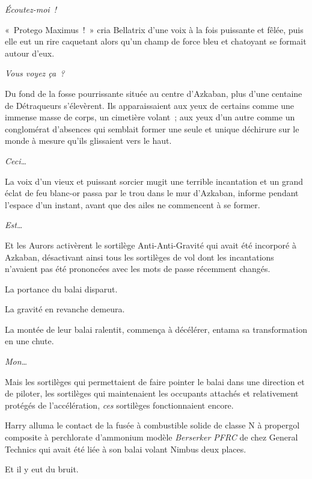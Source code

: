 \emph{Écoutez-moi~!}

«~Protego Maximus~!~» cria Bellatrix d'une voix à la fois puissante et fêlée, puis elle eut un rire caquetant alors qu'un champ de force bleu et chatoyant se formait autour d'eux.

\emph{Vous voyez ça~?}

Du fond de la fosse pourrissante située au centre d'Azkaban, plus d'une centaine de Détraqueurs s'élevèrent. Ils apparaissaient aux yeux de certains comme une immense masse de corps, un cimetière volant~; aux yeux d'un autre comme un conglomérat d'absences qui semblait former une seule et unique déchirure sur le monde à mesure qu'ils glissaient vers le haut.

\emph{Ceci…}

La voix d'un vieux et puissant sorcier mugit une terrible incantation et un grand éclat de feu blanc-or passa par le trou dans le mur d'Azkaban, informe pendant l'espace d'un instant, avant que des ailes ne commencent à se former.

\emph{Est…}

Et les Aurors activèrent le sortilège Anti-Anti-Gravité qui avait été incorporé à Azkaban, désactivant ainsi tous les sortilèges de vol dont les incantations n'avaient pas été prononcées avec les mots de passe récemment changés.

La portance du balai disparut.

La gravité en revanche demeura.

La montée de leur balai ralentit, commença à décélérer, entama sa transformation en une chute.

\emph{Mon…}

Mais les sortilèges qui permettaient de faire pointer le balai dans une direction et de piloter, les sortilèges qui maintenaient les occupants attachés et relativement protégés de l'accélération, \emph{ces} sortilèges fonctionnaient encore.


Harry alluma le contact de la fusée à combustible solide de classe N à propergol composite à perchlorate d'ammonium modèle \emph{Berserker PFRC} de chez General Technics qui avait été liée à son balai volant Nimbus  deux places.

Et il y eut du bruit.
